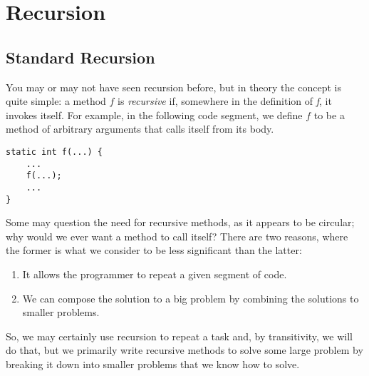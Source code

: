 \section{Recursion}

\subsection*{Standard Recursion}
You may or may not have seen recursion before, but in theory the concept is quite simple: a method $f$ is \textit{recursive} if, somewhere in the definition of \textit{f}, it invokes itself. For example, in the following code segment, we define $f$ to be a method of arbitrary arguments that calls itself from its body. 
\par{
\begin{verbatim}
static int f(...) {
    ...
    f(...);
    ...
}
\end{verbatim}
}
Some may question the need for recursive methods, as it appears to be circular; why would we ever want a method to call itself? There are two reasons, where the former is what we consider to be less significant than the latter:
\begin{enumerate}
    \item It allows the programmer to repeat a given segment of code.
    \item We can compose the solution to a big problem by combining the solutions to smaller problems.
\end{enumerate}
So, we may certainly use recursion to repeat a task and, by transitivity, we will do that, but we primarily write recursive methods to solve some large problem by breaking it down into smaller problems that we know how to solve.

